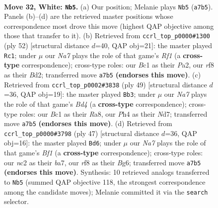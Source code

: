 \documentclass[11pt]{article}
\begin{document}
\clearpage

\begin{figure}[p]\centering
\begin{subfigure}{0.46\textwidth}\centering
\resizebox{\linewidth}{!}{%
\newchessgame
\chessboard[
  setfen={3k1r2/Npp1p2p/6p1/p1n5/5P1P/2P5/P1n2PK1/2B4R w - - 9 32},
  showmover=false,
  pgfstyle=straightmove, color=movearrow, markmove={a7-b5}
]}
\caption{}
\end{subfigure}\hfill
\begin{subfigure}{0.46\textwidth}\centering
\resizebox{\linewidth}{!}{%
\newchessgame
\chessboard[
  setfen={6k1/pp3pp1/7p/3rn3/3p3P/6P1/PP1BPPK1/5R2 w - - 0 27},
  showmover=false,
  pgfstyle=straightmove, color=movearrow, markmove={f1-c1}
]}
\caption{}
\end{subfigure}
\\[4pt]
\begin{subfigure}{0.46\textwidth}\centering
\resizebox{\linewidth}{!}{%
\newchessgame
\chessboard[
  setfen={r7/pp1nkppp/2p5/3b4/NP3PP1/P3P3/4B2P/2R3K1 b - - 0 25},
  showmover=false,
  pgfstyle=straightmove, color=movearrow, markmove={d5-b3}
]}
\caption{}
\end{subfigure}\hfill
\begin{subfigure}{0.46\textwidth}\centering
\resizebox{\linewidth}{!}{%
\newchessgame
\chessboard[
  setfen={5br1/Bp1k4/2p3b1/3p2pp/N7/3P4/PPP3PP/2K1R3 b - - 0 24},
  showmover=false,
  pgfstyle=straightmove, color=movearrow, markmove={f8-d6}
]}
\caption{}
\end{subfigure}
\caption{\textbf{Move 32, White: \texttt{Nb5}.} (a) Our position; Melanie plays \texttt{Nb5} (\texttt{a7b5}). Panels (b)--(d) are the retrieved master positions whose correspondence most drove this move (highest QAP objective among those that transfer to it). (b) Retrieved from \texttt{ccrl\_top\_p0000\#1300} (ply 52) [structural distance $d$=40, QAP obj=21]: the master played \texttt{Rc1}; under $\mu$ our \emph{Na7} plays the role of that game's \emph{Rf1} (a \textbf{cross-type} correspondence); cross-type roles: our \emph{B}c1 as their \emph{P}a2, our \emph{r}f8 as their \emph{B}d2; transferred move \texttt{a7b5} \textbf{(endorses this move)}. (c) Retrieved from \texttt{ccrl\_top\_p0002\#3838} (ply 49) [structural distance $d$=36, QAP obj=19]: the master played \texttt{Bb3}; under $\mu$ our \emph{Na7} plays the role of that game's \emph{Bd4} (a \textbf{cross-type} correspondence); cross-type roles: our \emph{B}c1 as their \emph{R}a8, our \emph{P}h4 as their \emph{N}d7; transferred move \texttt{a7b5} \textbf{(endorses this move)}. (d) Retrieved from \texttt{ccrl\_top\_p0000\#3798} (ply 47) [structural distance $d$=36, QAP obj=16]: the master played \texttt{Bd6}; under $\mu$ our \emph{Na7} plays the role of that game's \emph{Bf1} (a \textbf{cross-type} correspondence); cross-type roles: our \emph{n}c2 as their \emph{b}a7, our \emph{r}f8 as their \emph{B}g6; transferred move \texttt{a7b5} \textbf{(endorses this move)}. Synthesis: 10 retrieved analogs transferred to \texttt{Nb5} (summed QAP objective 118, the strongest correspondence among the candidate moves); Melanie committed it via the \texttt{search} selector.}
\label{fig:thought-m62}
\end{figure}
\end{document}
